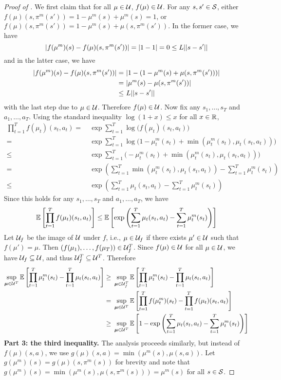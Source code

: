 \begin{proof}[Proof of ]
We first claim that for all $\mu \in \mathcal{U}$, $f(\mu) \in \mathcal{U}$. For any $s,s' \in \mathcal{S}$, either $f(\mu)(s,\pi^m(s')) = 1 - \mu^m(s) + \mu^m(s) = 1$, or $f(\mu)(s,\pi^m(s')) = 1 - \mu^m(s) + \mu(s,\pi^m(s'))$. In the former case, we have
\[
|f(\mu^m)(s) - f(\mu)(s,\pi^m(s'))| = |1-1| = 0 \le L ||s-s'||
\]
and in the latter case, we have
\begin{align*}
|f(\mu^m)(s) - f(\mu)(s,\pi^m(s'))| =&\ |1 - (1 - \mu^m(s) + \mu(s, \pi^m(s')))|\\
=&\ |\mu^m(s) - \mu(s,\pi^m(s'))|\\
\le&\ L||s-s'||
\end{align*}
with the last step due to $\mu \in \mathcal{U}$. Therefore $f(\mu) \in \mathcal{U}$. Now fix any $s_1,\dots,s_T$ and $a_1,\dots,a_T$. Using the standard inequality $\log(1+x) \le x$ for all $x \in \mathbb{R}$,
\begin{align*}
\prod_{t=1}^T f(\mu_t)(s_t, a_t) =&\ \exp \sum_{t=1}^T \log \big(f(\mu_t)(s_t, a_t)\big)\\
=&\ \exp \sum_{t=1}^T \log \big(1 - \mu_t^m(s_t) + \min(\mu_t^m(s_t), \mu_t(s_t,a_t))\big)\\
\le&\ \exp \sum_{t=1}^T \big(- \mu_t^m(s_t) + \min(\mu_t^m(s_t), \mu_t(s_t,a_t))\big)\\
=&\ \exp \left(\sum_{t=1}^T \min(\mu_t^m(s_t), \mu_t(s_t,a_t)) -\sum_{t=1}^T \mu_t^m(s_t) \right)\\
\le&\ \exp \left(\sum_{t=1}^T  \mu_t(s_t,a_t) -\sum_{t=1}^T \mu_t^m(s_t) \right)
\end{align*}
Since this holds for any $s_1,\dots,s_T$ and $a_1,\dots,a_T$, we have
\[
\operatorname*{\mathbb{E}}\left[\prod_{t=1}^T f(\mu_t)(s_t, a_t)\right] \le \operatorname*{\mathbb{E}}\left[\exp \left(\sum_{t=1}^T  \mu_t(s_t,a_t) -\sum_{t=1}^T \mu_t^m(s_t) \right)\right]
\]
Let $\mathcal{U}_f$ be the image of $\mathcal{U}$ under $f$, i.e., $\mu \in \mathcal{U}_f$ if there exists $\mu' \in \mathcal{U}$ such that $f(\mu') = \mu$. Then $(f(\mu_1),\dots,f(\mu_T)) \in \mathcal{U}_f^T$. Since $f(\mu) \in \mathcal{U}$ for all $\mu \in \mathcal{U}$, we have $\mathcal{U}_f \subseteq \mathcal{U}$, and thus $\mathcal{U}_f^T \subseteq \mathcal{U}^T$. Therefore
\begin{align*}
\sup_{\boldsymbol{\mu} \in \mathcal{U}^T}  \operatorname*{\mathbb{E}}\left[\prod_{t=1}^T \mu_t^m(s_t) - \prod_{t=1}^T \mu_t(s_t, a_t)\right] \ge&\ \sup_{\boldsymbol{\mu} \in \mathcal{U}_f^T}  \operatorname*{\mathbb{E}}\left[\prod_{t=1}^T \mu_t^m(s_t) - \prod_{t=1}^T \mu_t(s_t, a_t)\right]\\
=&\ \sup_{\boldsymbol{\mu} \in \mathcal{U}^T} \operatorname*{\mathbb{E}}\left[\prod_{t=1}^T f(\mu_t^m)(s_t) - \prod_{t=1}^T f(\mu_t)(s_t, a_t)\right]\\
\ge&\ \sup_{\boldsymbol{\mu} \in \mathcal{U}^T} \operatorname*{\mathbb{E}}\left[1 - \exp \left(\sum_{t=1}^T \mu_t(s_t,a_t) -\sum_{t=1}^T \mu_t^m(s_t) \right)\right]
\end{align*}
\textbf{Part 3: the third inequality.} The analysis proceeds similarly, but instead of $f(\mu)(s,a)$, we use $g(\mu)(s,a) = \min(\mu^m(s), \mu(s,a))$. Let $g(\mu^m)(s) = g(\mu)(s,\pi^m(s))$ for brevity and note that $g(\mu^m)(s) = \min(\mu^m(s), \mu(s,\pi^m(s))) = \mu^m(s)$ for all $s \in \mathcal{S}$.


\end{proof}
